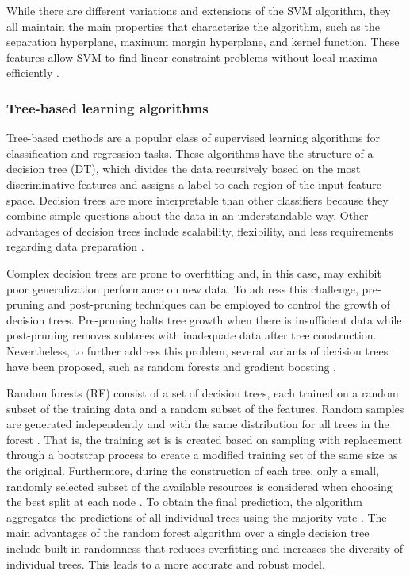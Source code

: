 While there are different variations and extensions of the SVM algorithm, they all maintain the main properties that characterize the algorithm, such as the separation hyperplane, maximum margin hyperplane, and kernel function. These features allow SVM to find linear constraint problems without local maxima efficiently \cite{mammone2009support}.



\subsubsection{Tree-based learning algorithms}

Tree-based methods are a popular class of supervised learning algorithms for classification and regression tasks. These algorithms have the structure of a decision tree (DT), which divides the data recursively based on the most discriminative features and assigns a label to each region of the input feature space. Decision trees are more interpretable than other classifiers because they combine simple questions about the data in an understandable way. Other advantages of decision trees include scalability, flexibility, and less requirements regarding data preparation \cite{kotsiantis2013decision}.

Complex decision trees are prone to overfitting and, in this case, may exhibit poor generalization performance on new data. To address this challenge, pre-pruning and post-pruning techniques can be employed to control the growth of decision trees. Pre-pruning halts tree growth when there is insufficient data while post-pruning removes subtrees with inadequate data after tree construction. Nevertheless, to further address this problem, several variants of decision trees have been proposed, such as random forests and gradient boosting \cite{kingsford2008decision}.

Random forests (RF) consist of a set of decision trees, each trained on a random subset of the training data and a random subset of the features. Random samples are generated independently and with the same distribution for all trees in the forest \cite{breiman2001random}. That is, the training set is is created based on sampling with replacement through a bootstrap process to create a modified training set of the same size as the original. Furthermore, during the construction of each tree, only a small, randomly selected subset of the available resources is considered when choosing the best split at each node \cite{kingsford2008decision}. To obtain the final prediction, the algorithm aggregates the predictions of all individual trees using the majority vote \cite{breiman2001random}. The main advantages of the random forest algorithm over a single decision tree include built-in randomness that reduces overfitting and increases the diversity of individual trees. This leads to a more accurate and robust model. 




